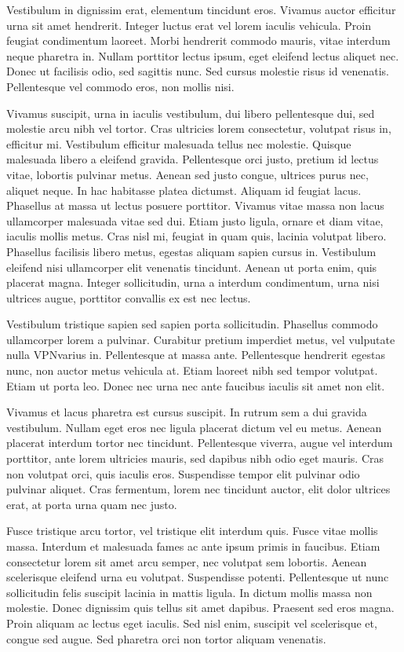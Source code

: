 \documentclass{report}
\begin{document}
Vestibulum in dignissim erat, elementum tincidunt eros. Vivamus auctor efficitur urna sit amet hendrerit. Integer luctus erat vel lorem iaculis vehicula. Proin feugiat condimentum laoreet. Morbi hendrerit commodo mauris, vitae interdum neque pharetra in. Nullam porttitor lectus ipsum, eget eleifend lectus aliquet nec. Donec ut facilisis odio, sed sagittis nunc. Sed cursus molestie risus id venenatis. Pellentesque vel commodo eros, non mollis nisi.

Vivamus suscipit, urna in iaculis vestibulum, dui libero pellentesque dui, sed molestie arcu nibh vel tortor. Cras ultricies lorem consectetur, volutpat risus in, efficitur mi. Vestibulum efficitur malesuada tellus nec molestie. Quisque malesuada libero a eleifend gravida. Pellentesque orci justo, pretium id lectus vitae, lobortis pulvinar metus. Aenean sed justo congue, ultrices purus nec, aliquet neque. In hac habitasse platea dictumst. Aliquam id feugiat lacus. Phasellus at massa ut lectus posuere porttitor. Vivamus vitae massa non lacus ullamcorper malesuada vitae sed dui. Etiam justo ligula, ornare et diam vitae, iaculis mollis metus. Cras nisl mi, feugiat in quam quis, lacinia volutpat libero. Phasellus facilisis libero metus, egestas aliquam sapien cursus in. Vestibulum eleifend nisi ullamcorper elit venenatis tincidunt. Aenean ut porta enim, quis placerat magna. Integer sollicitudin, urna a interdum condimentum, urna nisi ultrices augue, porttitor convallis ex est nec lectus.

Vestibulum tristique sapien sed sapien porta sollicitudin. Phasellus commodo ullamcorper lorem a pulvinar. Curabitur pretium imperdiet metus, vel vulputate nulla \gls{VPN}varius in. Pellentesque at massa ante. Pellentesque hendrerit egestas nunc, non auctor metus vehicula at. Etiam laoreet nibh sed tempor volutpat. Etiam ut porta leo. Donec nec urna nec ante faucibus iaculis sit amet non elit.

Vivamus et lacus pharetra est cursus suscipit. In rutrum sem a dui gravida vestibulum. Nullam eget eros nec ligula placerat dictum vel eu metus. Aenean placerat interdum tortor nec tincidunt. Pellentesque viverra, augue vel interdum porttitor, ante lorem ultricies mauris, sed dapibus nibh odio eget mauris. Cras non volutpat orci, quis iaculis eros. Suspendisse tempor elit pulvinar odio pulvinar aliquet. Cras fermentum, lorem nec tincidunt auctor, elit dolor ultrices erat, at porta urna quam nec justo.

Fusce tristique arcu tortor, vel tristique elit interdum quis. Fusce vitae mollis massa. Interdum et malesuada fames ac ante ipsum primis in faucibus. Etiam consectetur lorem sit amet arcu semper, nec volutpat sem lobortis. Aenean scelerisque eleifend urna eu volutpat. Suspendisse potenti. Pellentesque ut nunc sollicitudin felis suscipit lacinia in mattis ligula. In dictum mollis massa non molestie. Donec dignissim quis tellus sit amet dapibus. Praesent sed eros magna. Proin aliquam ac lectus eget iaculis. Sed nisl enim, suscipit vel scelerisque et, congue sed augue. Sed pharetra orci non tortor aliquam venenatis.
\end{document}
